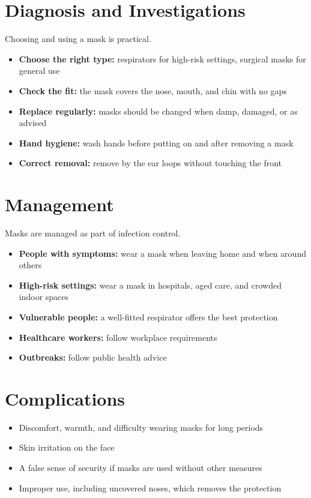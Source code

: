 \section*{Diagnosis and Investigations}
Choosing and using a mask is practical.
\begin{itemize}
    \item \textbf{Choose the right type:} respirators for high-risk settings, surgical masks for general use
    \item \textbf{Check the fit:} the mask covers the nose, mouth, and chin with no gaps
    \item \textbf{Replace regularly:} masks should be changed when damp, damaged, or as advised
    \item \textbf{Hand hygiene:} wash hands before putting on and after removing a mask
    \item \textbf{Correct removal:} remove by the ear loops without touching the front
\end{itemize}

\section*{Management}
Masks are managed as part of infection control.
\begin{itemize}
    \item \textbf{People with symptoms:} wear a mask when leaving home and when around others
    \item \textbf{High-risk settings:} wear a mask in hospitals, aged care, and crowded indoor spaces
    \item \textbf{Vulnerable people:} a well-fitted respirator offers the best protection
    \item \textbf{Healthcare workers:} follow workplace requirements
    \item \textbf{Outbreaks:} follow public health advice
\end{itemize}

\section*{Complications}
\begin{itemize}
    \item Discomfort, warmth, and difficulty wearing masks for long periods
    \item Skin irritation on the face
    \item A false sense of security if masks are used without other measures
    \item Improper use, including uncovered noses, which removes the protection
\end{itemize}

